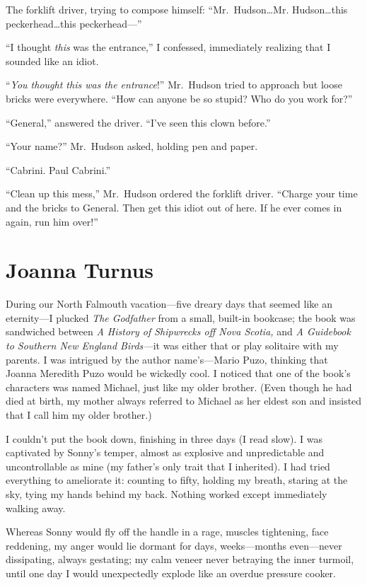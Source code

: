 The forklift driver, trying to compose himself: ``Mr.~Hudson\ldots Mr.
Hudson\ldots this peckerhead\ldots this peckerhead---''

``I thought \emph{this} was the entrance,'' I confessed, immediately
realizing that I sounded like an idiot.

``\emph{You thought this was the entrance}!'' Mr.~Hudson tried to
approach but loose bricks were everywhere. ``How can anyone be so
stupid? Who do you work for?''

``General,'' answered the driver. ``I've seen this clown before.''

``Your name?'' Mr.~Hudson asked, holding pen and paper.

``Cabrini. Paul Cabrini.''

``Clean up this mess,'' Mr.~Hudson ordered the forklift driver. ``Charge
your time and the bricks to General. Then get this idiot out of here. If
he ever comes in again, run him over!''

\chapter{Joanna Turnus}

\titlemark

During our North Falmouth vacation---five dreary days that seemed like
an eternity---I plucked \emph{The Godfather} from a small, built-in
bookcase; the book was sandwiched between \emph{A History of Shipwrecks
off Nova Scotia,} and \emph{A Guidebook to Southern New England
Birds---}it was either that or play solitaire with my parents. I was
intrigued by the author name's---Mario Puzo, thinking that Joanna
Meredith Puzo would be wickedly cool. I noticed that one of the book's
characters was named Michael, just like my older brother. (Even though
he had died at birth, my mother always referred to Michael as her eldest
son and insisted that I call him my older brother.)

I couldn't put the book down, finishing in three days (I read slow). I
was captivated by Sonny's temper, almost as explosive and unpredictable
and uncontrollable as mine (my father's only trait that I inherited). I
had tried everything to ameliorate it: counting to fifty, holding my
breath, staring at the sky, tying my hands behind my back. Nothing
worked except immediately walking away.

Whereas Sonny would fly off the handle in a rage, muscles tightening,
face reddening, my anger would lie dormant for days, weeks---months
even---never dissipating, always gestating; my calm veneer never
betraying the inner turmoil, until one day I would unexpectedly explode
like an overdue pressure cooker.


